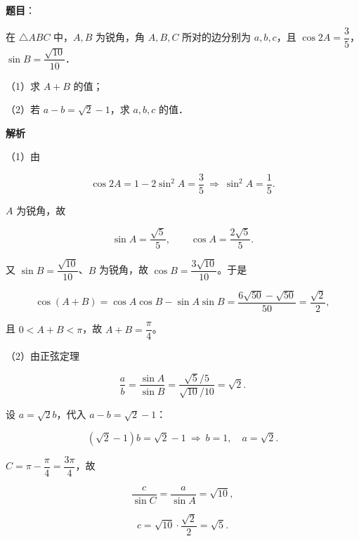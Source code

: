 \begin{answer}

\textbf{题目}：

在 $\triangle ABC$ 中，$A,B$ 为锐角，角 $A,B,C$ 所对的边分别为 $a,b,c$，且 $\cos2A=\dfrac35$，$\sin B=\dfrac{\sqrt{10}}{10}$．

（1）求 $A+B$ 的值；

（2）若 $a-b=\sqrt2-1$，求 $a,b,c$ 的值．

\textbf{解析}

（1）由

\nopagebreak[4]
\[\cos2A=1-2\sin^2A=\frac35\ \Longrightarrow\ \sin^2A=\frac15 .\]

$A$ 为锐角，故

\nopagebreak[4]
\[\sin A=\frac{\sqrt5}{5},\qquad \cos A=\frac{2\sqrt5}{5}.\]

又 $\sin B=\dfrac{\sqrt{10}}{10}$、$B$ 为锐角，故 $\cos B=\dfrac{3\sqrt{10}}{10}$。于是

\nopagebreak[4]
\[\cos(A+B)=\cos A\cos B-\sin A\sin B
=\frac{6\sqrt{50}-\sqrt{50}}{50}
=\frac{\sqrt2}{2},\]

且 $0<A+B<\pi$，故 $A+B=\dfrac\pi4$。

（2）由正弦定理

\nopagebreak[4]
\[\frac ab=\frac{\sin A}{\sin B}
=\frac{\sqrt5/5}{\sqrt{10}/10}=\sqrt2 .\]

设 $a=\sqrt2b$，代入 $a-b=\sqrt2-1$：

\nopagebreak[4]
\[(\sqrt2-1)b=\sqrt2-1\ \Longrightarrow\ b=1,\quad a=\sqrt2 .\]

$C=\pi-\dfrac\pi4=\dfrac{3\pi}{4}$，故

\nopagebreak[4]
\[\frac{c}{\sin C}=\frac{a}{\sin A}=\sqrt{10},\]

\nopagebreak[4]
\[c=\sqrt{10}\cdot\frac{\sqrt2}{2}=\sqrt5 .\]


\end{answer}
